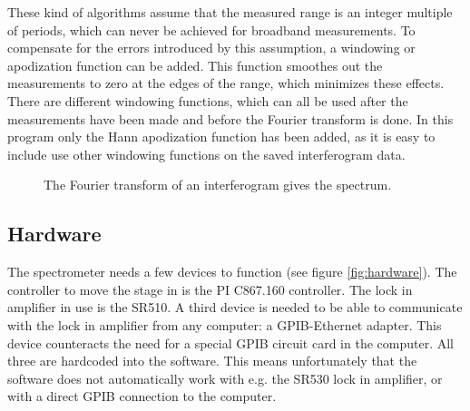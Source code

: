 These kind of algorithms assume that the measured range is an integer multiple of periods, which can never be achieved for broadband measurements. To compensate for the errors introduced by this assumption, a windowing or apodization function can be added. This function smoothes out the measurements to zero at the edges of the range, which minimizes these effects. There are different windowing functions, which can all be used after the measurements have been made and before the Fourier transform is done. In this program only the Hann apodization function has been added, as it is easy to include use other windowing functions on the saved interferogram data.

\begin{figure}
 \begin{center}
  \quad
  \caption{The Fourier transform of an interferogram gives the spectrum.}
  \label{fig:fouriertransform}
 \end{center}
\end{figure}

\subsection{Hardware}

The spectrometer needs a few devices to function (see figure \ref{fig:hardware}). The controller to move the stage in is the PI C867.160 controller. The lock in amplifier in use is the SR510. A third device is needed to be able to communicate with the lock in amplifier from any computer: a GPIB-Ethernet adapter. This device counteracts the need for a special GPIB circuit card in the computer. All three are hardcoded into the software. This means unfortunately that the software does not automatically work with e.g. the SR530 lock in amplifier, or with a direct GPIB connection to the computer.

